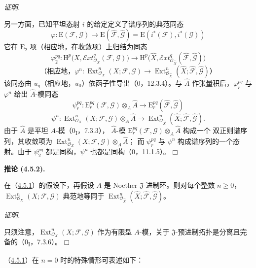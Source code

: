 \documentclass[UTF8,fontset=none,11pt,oneside,openany]{ctexbook}
\providecommand{\square}{\mdlgwhtsquare}
\newenvironment{corollary}[1][]{%
  \par\medskip\noindent\textbf{推论 (#1).}\ %
}{\par}
\newenvironment{proof}{%
  \par\smallskip\noindent\textit{证明.}\ %
}{\hfill$\square$\par}
\let\EGAOriginalLabel\label
\renewcommand{\label}[1]{\phantomsection\EGAOriginalLabel{#1}}
\begin{document}
\begin{proof}
另一方面，已知平坦态射 $i$ 的给定定义了谱序列的典范同态
\[
\varphi:\mathrm E(\mathcal F,\mathcal G)\longrightarrow
\mathrm E(\widehat{\mathcal F},\widehat{\mathcal G})
=\mathrm E(i^*(\mathcal F),i^*(\mathcal G))
\]
它在 $\mathrm E_2$ 项（相应地，在收敛项）上归结为同态
\[
\varphi_2^{pq}:\mathrm H^p\bigl(X,
\mathcal{E}\!xt^q_{\mathcal O_X}(\mathcal F,\mathcal G)\bigr)
\longrightarrow
\mathrm H^p\bigl(\widehat X,
\mathcal{E}\!xt^q_{\mathcal O_{\widehat X}}
(\widehat{\mathcal F},\widehat{\mathcal G})\bigr)
\]
\[
\text{（相应地，}\varphi^n:\operatorname{Ext}^n_{\mathcal O_X}
(X;\mathcal F,\mathcal G)\longrightarrow
\operatorname{Ext}^n_{\mathcal O_{\widehat X}}
(\widehat X;\widehat{\mathcal F},\widehat{\mathcal G})\text{）}
\]
该同态由 $u_q$（相应地，$u_0$）依函子性导出（0，12.3.4）。与
$\widehat A$ 作张量积后，$\varphi_r^{pq}$ 与 $\varphi^n$ 给出
$\widehat A$-模同态
\[
\psi_r^{pq}:\mathrm E_r^{pq}(\mathcal F,\mathcal G)
\otimes_A\widehat A\longrightarrow
\mathrm E_r^{pq}(\widehat{\mathcal F},\widehat{\mathcal G})
\]
\[
\psi^n:\operatorname{Ext}^n_{\mathcal O_X}(X;\mathcal F,\mathcal G)
\otimes_A\widehat A\longrightarrow
\operatorname{Ext}^n_{\mathcal O_{\widehat X}}
(\widehat X;\widehat{\mathcal F},\widehat{\mathcal G}).
\]
由于 $\widehat A$ 是平坦 $A$-模（0\textsubscript{I}，7.3.3），
$\widehat A$-模
$\mathrm E_r^{pq}(\mathcal F,\mathcal G)\otimes_A\widehat A$ 构成一个
双正则谱序列，其收敛项为
$\operatorname{Ext}^n_{\mathcal O_X}(X;\mathcal F,\mathcal G)\otimes_A\widehat A$；
而 $\psi_r^{pq}$ 与 $\psi^n$ 构成谱序列的一个态射。由于
$\psi_2^{pq}$ 都是同构，$\psi^n$ 也都是同构（0，11.1.5）。
\end{proof}

\begin{corollary}[4.5.2]
\label{III.4.5.2-fr}
在（\hyperref[III.4.5.1-fr]{4.5.1}）的假设下，再假设 $A$ 是 Noether
$\mathfrak J$-进制环。则对每个整数 $n\geq0$，
$\operatorname{Ext}^n_{\mathcal O_X}(X;\mathcal F,\mathcal G)$ 典范地等同于
$\operatorname{Ext}^n_{\mathcal O_{\widehat X}}
(\widehat X;\widehat{\mathcal F},\widehat{\mathcal G})$。
\end{corollary}

\begin{proof}
只须注意，$\operatorname{Ext}^n_{\mathcal O_X}
(X;\mathcal F,\mathcal G)$ 作为有限型 $A$-模，关于
$\mathfrak J$-预进制拓扑是分离且完备的（0\textsubscript{I}，7.3.6）。
\end{proof}

（\hyperref[III.4.5.1-fr]{4.5.1}）在 $n=0$ 时的特殊情形可表述如下：
\end{document}

